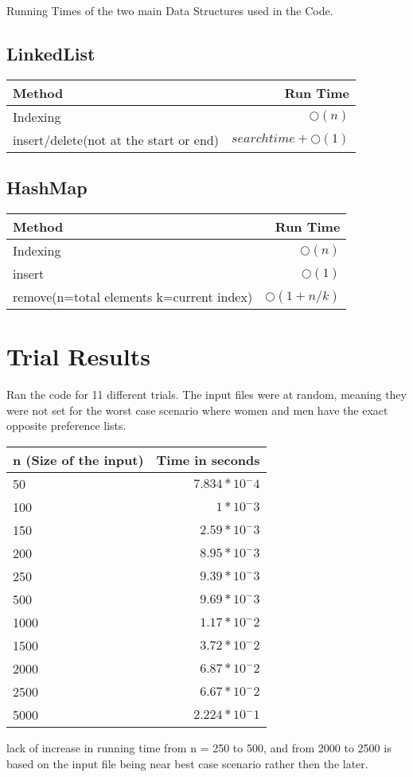 \documentclass[a4paper,12pt]{article}
\begin{document}
Running Times of the two main Data Structures used in the Code.

\subsection{LinkedList}
\begin{center}
\begin{tabular}{l|r}
\hline
 Method & Run Time\\
 \hline
 Indexing & \(\bigcirc (n)\)\\  
\hline
 insert/delete(not at the start or end) & \( search time +\bigcirc (1)\)\\ 
\hline
\end{tabular}
\end{center}


\subsection{HashMap}
\begin{center}
\begin{tabular}{l|r}
\hline
 Method & Run Time\\
 \hline
 Indexing & \(\bigcirc (n)\)\\  
\hline
 insert & \(\bigcirc (1)\)\\ 
\hline
 remove(n=total elements k=current index) & \(\bigcirc (1 + n/k)\)\\ 
\hline
\end{tabular}
\end{center}

\section{Trial Results}
Ran the code  for 11 different trials. The input files were at random, meaning they were not set
for the worst case scenario where women and men have the exact opposite preference lists.   
\begin{center}
\begin{tabular}{l|r}
\hline
 n (Size of the input) & Time in seconds\\
 \hline
 50 & \( 7.834*10^-4\)\\ 
\hline
 100 & \( 1*10^-3\)\\ 
\hline
 150 & \( 2.59*10^-3\)\\ 
\hline
200 & \( 8.95*10^-3\)\\ 
\hline
250 & \( 9.39*10^-3\)\\ 
\hline
500 & \( 9.69*10^-3\)\\ 
\hline
1000 & \( 1.17*10^-2\)\\ 
\hline
1500 & \( 3.72*10^-2\)\\ 
\hline
2000 & \( 6.87*10^-2\)\\ 
\hline
2500 & \( 6.67*10^-2\)\\ 
\hline
5000 & \( 2.224*10^-1\)\\ 
\hline
\end{tabular}
\end{center}
lack of increase in running time from n = 250 to 500, and from 2000 to 2500 is based on the input file being near best case scenario rather then the later.  
\end{document}
